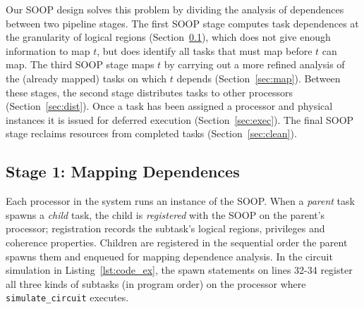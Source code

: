 Our SOOP design solves this problem by dividing the analysis of
dependences between two pipeline stages.  The first SOOP stage
computes task dependences at the granularity of logical regions
(Section~\ref{sec:dep}), which does not give enough information to map
$t$, but does identify all tasks that must map before $t$ can map.
The third SOOP stage maps $t$ by carrying out a more refined analysis
of the (already mapped) tasks on which $t$ depends
(Section~\ref{sec:map}).  Between these stages, the second stage
distributes tasks to other processors (Section~\ref{sec:dist}).  Once
a task has been assigned a processor and physical instances it is
issued for deferred execution (Section~\ref{sec:exec}).  The final
SOOP stage reclaims resources from completed tasks
(Section~\ref{sec:clean}).

\subsection{Stage 1: Mapping Dependences}
\label{sec:dep}



Each processor in the system runs an instance of the SOOP.
When a {\em parent} task spawns a {\em child} task, the child is {\em registered}
with the SOOP on the parent's processor;
registration records the subtask's logical regions,
privileges and coherence properties.  Children are
registered in the sequential order the parent
spawns them and enqueued for mapping dependence analysis.  In the
circuit simulation in Listing~\ref{lst:code_ex}, the spawn
statements on lines 32-34 register all three
kinds of subtasks (in program order) on the processor where {\tt
simulate\_circuit} executes.

